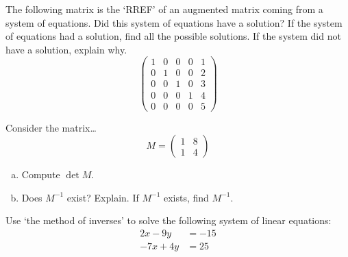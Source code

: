\documentclass[11pt,letterpaper]{article}
\begin{document}

 The following matrix is the `RREF' of an augmented matrix coming from a system of equations. Did this system of equations have a solution? If the system of equations had a solution, find all the possible solutions. If the system did not have a solution, explain why. 
	\[
	\begin{pmatrix}
	1 & 0 & 0 & 0 & 1 \\
	0 & 1 & 0 & 0 & 2 \\
	0 & 0 & 1 & 0 & 3 \\
	0 & 0 & 0 & 1 & 4 \\
	0 & 0 & 0 & 0 & 5 
	\end{pmatrix}
	\]



\newpage



 Consider the matrix\dots
	\[
	M= \begin{pmatrix} 1 & 8 \\ 1 & 4 \end{pmatrix}
	\] 

\begin{enumerate}[(a)]
\item Compute $\det M$. 
\item Does $M^{-1}$ exist? Explain. If $M^{-1}$ exists, find $M^{-1}$. 
\end{enumerate}



\newpage



 Use `the method of inverses' to solve the following system of linear equations:
	\[
	\begin{aligned}
	2x - 9y&= -15 \\
	-7x + 4y&= 25
	\end{aligned}
	\]
\end{document}
